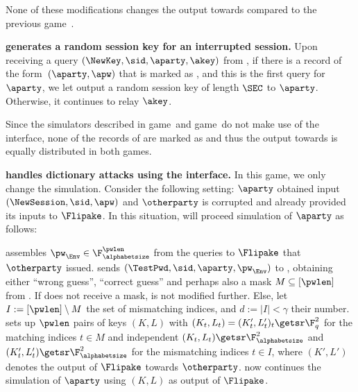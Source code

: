 \begin{games}
None of these modifications changes the output towards \Env compared to the previous game~\previousgame.

\textbf{\Func generates a random session key for an interrupted session.}
Upon receiving a query $(\NewKey,\sid,\aparty,\akey)$ from \Sim, if there is a record of the form~$(\aparty,\apw)$ that is marked as , and this is the first \NewKey query for~$\aparty$, we let \Func output a random session key of length $\SEC$ to $\aparty$.
Otherwise, it continues to relay $\akey$.

Since the simulators described in game~\previousgame and game~\thisgame do not make use of the \TestPwd interface, none of the records of \Func are marked as  and thus the output towards \Env is equally distributed in both games.

\textbf{\Sim handles dictionary attacks using the \TestPwd interface.}
In this game, we only change the simulation. Consider the following setting: $\aparty$ obtained input $(\NewSession,\sid,\apw)$ and $\otherparty$ is corrupted and already provided its inputs to $\Flipake$.
In this situation, \Sim will proceed simulation of $\aparty$ as follows:

\Sim assembles $\pw_\Env\in\F_\alphabetsize^\pwlen$ from the queries to $\Flipake$ that $\otherparty$ issued. \Sim sends $(\TestPwd,\sid,\aparty,\pw_\Env)$ to \Func, obtaining either ``wrong guess'', ``correct guess'' and perhaps also a mask $M\subseteq [\pwlen]$ from \Func. If \Sim does not receive a mask, \Sim is not modified further.
Else, let $I:=[\pwlen]\setminus M$ the set of mismatching indices, and $d:=|I|<\gamma$ their number.
\Sim sets up $\pwlen$ pairs of keys $(K,L)$ with $(K_t,L_t)=(K'_t,L'_t)_t \getsr \F_q^2$ for the matching indices $t\in M$
and independent $(K_t,L_t)\getsr\F_\alphabetsize^2$ and $(K'_t,L'_t)\getsr\F_\alphabetsize^2$ for the mismatching indices $t\in I$, where $(K',L')$ denotes the output of $\Flipake$ towards $\otherparty$. \Sim now continues the simulation of $\aparty$ using $(K,L)$ as output of $\Flipake$. 


\end{games}
